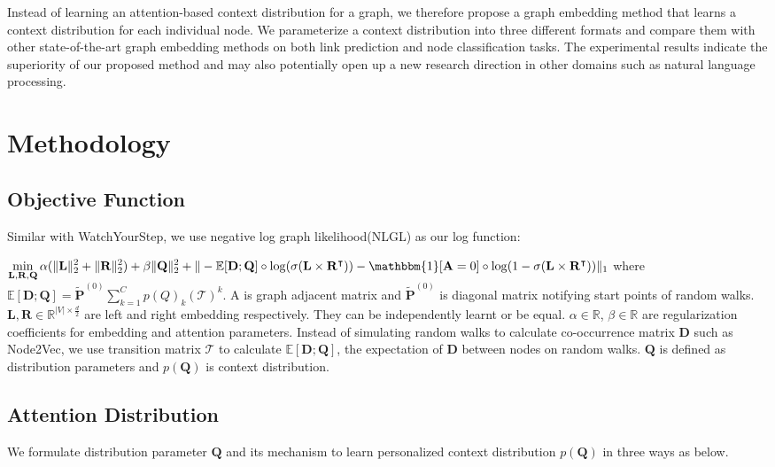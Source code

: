 \documentclass{article}
\begin{document}
Instead of learning an attention-based context distribution for a graph, we therefore propose a graph embedding method that learns a context distribution for each individual node. We parameterize a context distribution into three different formats and compare them with other state-of-the-art graph embedding methods on both link prediction and node classification tasks. The experimental results indicate the superiority of our proposed method and may also potentially open up a new research direction in other domains such as natural language processing. 

\section{Methodology}


\subsection{Objective Function}
Similar with WatchYourStep, we use negative log graph likelihood(NLGL) as our log function:

$\displaystyle\min_{\mathbf{L},\mathbf{R},\mathbf{Q}}\alpha(\|\mathbf{L}\|_2^2 + \|\mathbf{R}\|_2^2 ) + \beta\|\mathbf{Q}\|_2^2 +\|-\mathbb{E}[\mathbf{D};\mathbf{Q}]\circ\log(\sigma(\mathbf{L}\times\mathbf{R}^\intercal)) -\mathbbm{1}[\mathbf{A}=0]\circ\log(1-\sigma(\mathbf{L}\times\mathbf{R}^\intercal)) \|_1$
where $\mathbb{E}[\mathbf{D};\mathbf{Q}] = \tilde{\mathbf{P}}^{(0)}\displaystyle\sum_{k=1}^{C}p(Q)_k(\mathcal{T})^k$. A is graph adjacent matrix and $\tilde{\mathbf{P}}^{(0)}$ is diagonal matrix notifying start points of random walks. $\mathbf{L}, \mathbf{R} \in \mathbb{R}^{|V|\times \frac{d}{2}}$ are left and right embedding respectively. They can be independently learnt or be equal. $\alpha \in \mathbb{R}$, $\beta \in \mathbb{R}$ are regularization coefficients for embedding and attention parameters. Instead of simulating random walks to calculate co-occurrence matrix $\mathbf{D}$ such as Node2Vec, we use transition matrix $\mathcal{T}$ to calculate $\mathbb{E}[\mathbf{D};\mathbf{Q}]$, the expectation of $\mathbf{D}$ between nodes on random walks. $\mathbf{Q}$ is defined as distribution parameters and $p(\mathbf{Q})$ is context distribution. 

\subsection{Attention Distribution}
We formulate distribution parameter $\mathbf{Q}$ and its mechanism to learn personalized context distribution $p(\mathbf{Q})$ in three ways as below.
\end{document}

